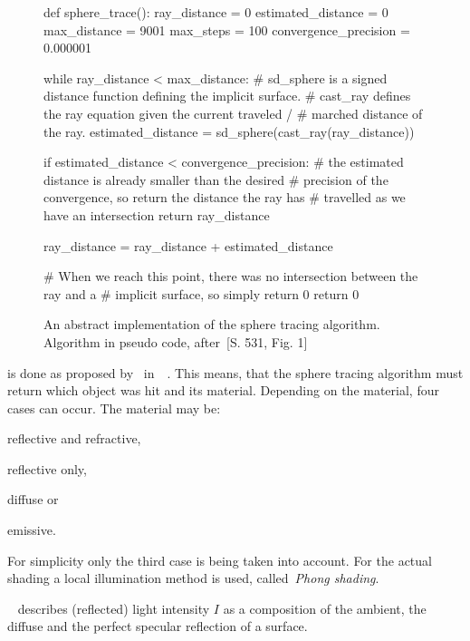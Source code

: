 \documentclass[%
    a4paper,    %
    justified,  %
    nobib,      %
    openany     %
]{tufte-book}
\begin{document}
\begin{figure}
  \label{alg:sphere-tracing}
  \caption{%
    An abstract implementation of the sphere tracing algorithm. Algorithm in
    pseudo code, after~\cite{hart_sphere_1994}[S. 531, Fig. 1]
  }
  \begin{pythoncode}
def sphere_trace():
    ray_distance          = 0
    estimated_distance    = 0
    max_distance          = 9001
    max_steps             = 100
    convergence_precision = 0.000001

    while ray_distance < max_distance:
        # sd_sphere is a signed distance function defining the implicit surface.
        # cast_ray defines the ray equation given the current traveled /
        # marched distance of the ray.
        estimated_distance = sd_sphere(cast_ray(ray_distance))

        if estimated_distance < convergence_precision:
            # the estimated distance is already smaller than the desired
            # precision of the convergence, so return the distance the ray has
            # travelled as we have an intersection
            return ray_distance

        ray_distance = ray_distance + estimated_distance

    # When we reach this point, there was no intersection between the ray and a
    # implicit surface, so simply return 0
    return 0
  \end{pythoncode}
\end{figure}

 is done as proposed by~\citeauthor{whitted_improved_1980}
in~~\cite{whitted_improved_1980}. This means,
that the sphere tracing algorithm must return which object was hit and its material.
Depending on the material, four cases can occur. The material may be:
\begin{enumerate*}
  \item reflective and refractive,
  \item reflective only,
  \item diffuse or
  \item emissive.
\end{enumerate*}
For simplicity only the third case is being taken into account. For the actual
shading a local illumination method is used, called~\textit{Phong shading}.

~\cite[p. 123]{foley_computer_1996} describes (reflected) light intensity
$I$ as a composition of the ambient, the diffuse and the perfect specular
reflection of a surface.
\end{document}
